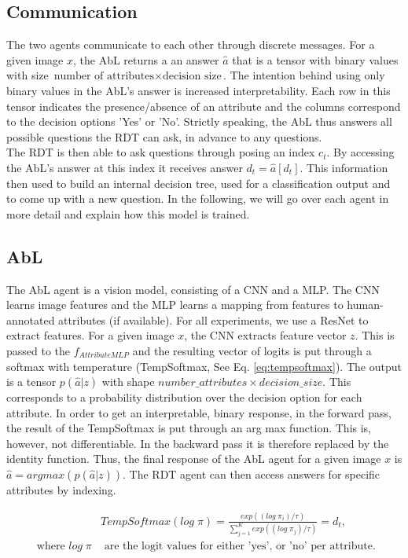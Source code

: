 \documentclass[a4paper,cleardoubleempty,BCOR1cm, 11pt]{report}
\begin{document}
\subsection{Communication}
The two agents communicate to each other through discrete messages. For a given image $x$, the AbL returns a an answer $\hat{a}$ that is a tensor with binary values with size $\text{number of attributes} \times \text{decision size}$. The intention behind using only binary values in the AbL's answer is increased interpretability. Each row in this tensor indicates the presence/absence of an attribute and the columns correspond to the decision options 'Yes' or 'No'. Strictly speaking, the AbL thus answers all possible questions the RDT can ask, in advance to any questions.\\
The RDT is then able to ask questions through posing an index $c_t$. By accessing the AbL's answer at this index it receives answer $d_t = \hat{a}[d_t]$. This information then used to build an internal decision tree, used for a classification output and to come up with a new question. In the following, we will go over each agent in more detail and explain how this model is trained.


\subsection{AbL}
The AbL agent is a vision model, consisting of a CNN and a MLP. The CNN learns image features and the MLP learns a mapping from features to human-annotated attributes (if available). For all experiments, we use a ResNet \cite{he2016deep} to extract features. For a given image $x$, the CNN extracts feature vector $z$. This is passed to the $f_{AttributeMLP}$ and the resulting vector of logits is put through a softmax with temperature (TempSoftmax, See Eq. \ref{eq:tempsoftmax}). The output is a tensor $p(\hat{a}|z)$ with shape $number\_attributes \times decision\_size$. This corresponds to a probability distribution over the decision option for each attribute. In order to get an interpretable, binary response, in the forward pass, the result of the TempSoftmax is put through an arg max function. This is, however, not differentiable. In the backward pass it is therefore replaced by the identity function. Thus, the final response of the AbL agent for a given image $x$ is $\hat{a} = argmax(p(\hat{a}|z))$. The RDT agent can then access answers for specific attributes by indexing.

\begin{align}\label{eq:tempsoftmax}
&TempSoftmax(log\;\pi) = \frac{exp((log\;\pi_i)/\tau)}{\sum_{j=1}^{K}exp((log\;\pi_j)/\tau)} = d_t,\\
\text{ where }
log\;\pi &\text{ are the logit values for either 'yes', or 'no' per attribute.}%
\end{align}
\end{document}
